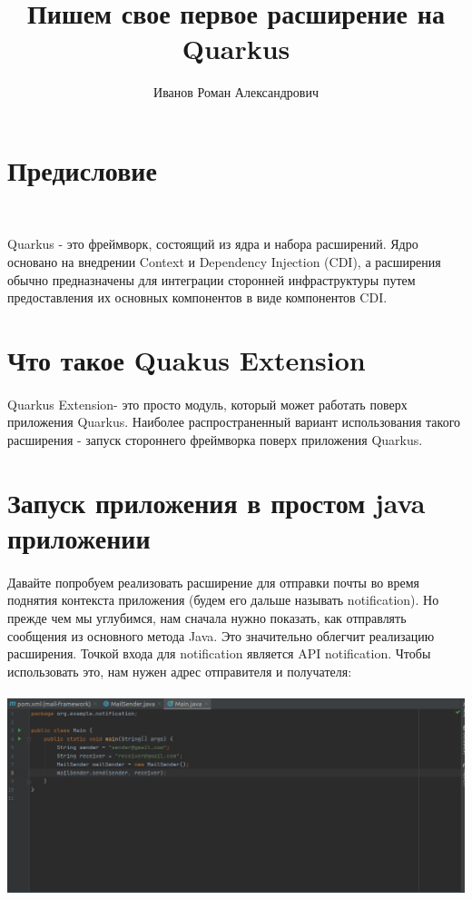 \documentclass[russian,11pt]{article}
\begin{document}
\title{Пишем свое первое расширение на Quarkus}
\author{Иванов Роман Александрович}

\maketitle

\newpage
\tableofcontents
\newpage

\section{Предисловие}
~

 Quarkus - это фреймворк, состоящий из ядра и набора расширений. Ядро основано на внедрении Context и Dependency Injection (CDI), а расширения обычно предназначены для интеграции сторонней инфраструктуры путем предоставления их основных компонентов в виде компонентов CDI.

\section{Что такое Quakus Extension}
\paragraph{	} Quarkus Extension- это просто модуль, который может работать поверх приложения Quarkus. Наиболее распространенный вариант использования такого расширения - запуск стороннего фреймворка поверх приложения Quarkus.

\section{Запуск приложения в простом java приложении}
\paragraph{ } 
Давайте попробуем реализовать расширение для отправки почты во время поднятия контекста приложения (будем его дальше называть notification). Но прежде чем мы углубимся, нам сначала нужно показать, как отправлять сообщения из основного метода Java. Это значительно облегчит реализацию расширения. Точкой входа для notification является API notification. Чтобы использовать это, нам нужен адрес отправителя и получателя:

\paragraph{\includegraphics[scale=1.5, width=\textwidth]{1}}
~
\end{document}

